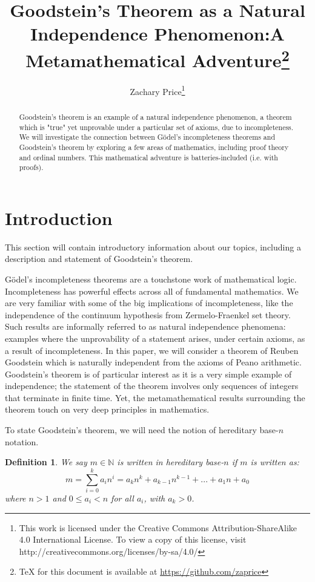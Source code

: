 \documentclass[10pt]{article}
\title{Goodstein's Theorem as a Natural Independence Phenomenon:\newline A Metamathematical Adventure\footnote {
TeX for this document is available at \url{https://github.com/zaprice}
}}
\author{Zachary Price\footnote { 
\ccbysa \indent This work is licensed under the Creative Commons Attribution-ShareAlike 4.0 International License. To view a copy of this license, visit http://creativecommons.org/licenses/by-sa/4.0/
}}
\newcommand{\N}{\mathbb{N}}
\begin{document}
\maketitle

\newtheorem{define}{Definition}
\newtheorem{thm}{Theorem}
\newtheorem{lem}{Lemma}
\newtheorem{conj}{Conjecture}

\begin{abstract}
Goodstein's theorem is an example of a natural independence phenomenon, a theorem which is "true" yet unprovable under a particular set of axioms, due to incompleteness.
We will investigate the connection between G{\"o}del's incompleteness theorems and Goodstein's theorem by exploring a few areas of mathematics, including proof theory and ordinal numbers.
This mathematical adventure is batteries-included (i.e. with proofs).
\end{abstract}

\section{Introduction}
This section will contain introductory information about our topics, including a description and statement of Goodstein's theorem.

G{\"o}del's incompleteness theorems are a touchstone work of mathematical logic. Incompleteness has powerful effects across all of fundamental mathematics.
We are very familiar with some of the big implications of incompleteness, like the independence of the continuum hypothesis from Zermelo-Fraenkel set theory.
Such results are informally referred to as natural independence phenomena: examples where the unprovability of a statement arises, under certain axioms, as a result of incompleteness.
In this paper, we will consider a theorem of Reuben Goodstein which is naturally independent from the axioms of Peano arithmetic.
Goodstein's theorem is of particular interest as it is a very simple example of independence; the statement of the theorem involves only sequences of integers that terminate in finite time.
Yet, the metamathematical results surrounding the theorem touch on very deep principles in mathematics.

To state Goodstein's theorem, we will need the notion of hereditary base-$n$ notation.

\begin{define}
We say $m\in\N$ is written in \emph{hereditary base-$n$} if $m$ is written as:
$$m = \sum_{i=0}^{k} a_in^i = a_kn^k + a_{k-1}n^{k-1} + ... + a_1n + a_0$$
where $n>1$ and $0\leq a_i < n$	for all $a_i$, with $a_k>0$.
\end{define}
\end{document}
